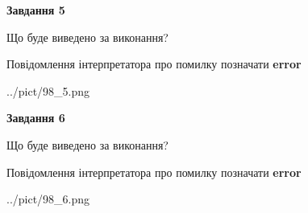 \documentclass[12pt, ukrainian]{article}
\begin{document}
{{\begin {center}\textbf{Завдання 5}\end {center}}\par
Що буде виведено за виконання? \par
Повідомлення інтерпретатора про помилку позначати \textbf{error}

\begin{center}
	{../pict/98_5.png}
\end{center}
\newpage

{\begin {center}\textbf{Завдання 6}\end {center}}\par
Що буде виведено за виконання? \par
Повідомлення інтерпретатора про помилку позначати \textbf{error}

\begin{center}
	{../pict/98_6.png}
\end{center}
\newpage

}
\end{document}
